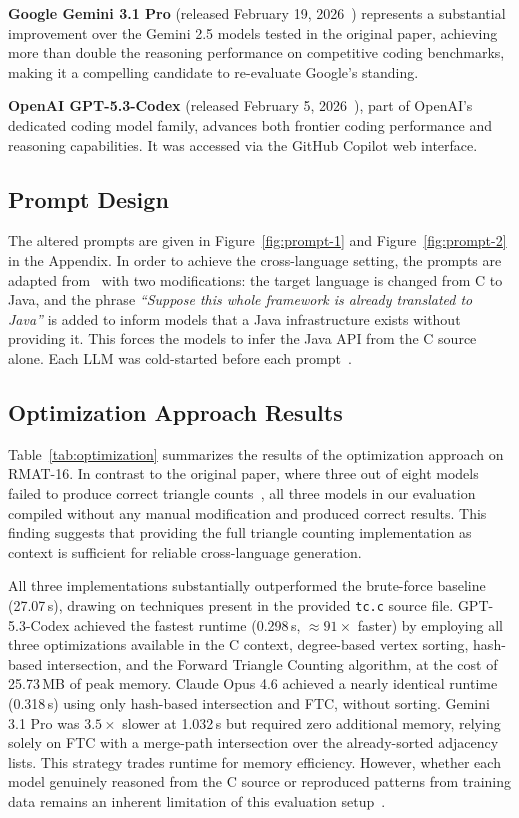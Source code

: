 \textbf{Google Gemini 3.1 Pro} (released February 19, 2026~\cite{google2026gemini31pro}) represents a substantial improvement over the Gemini 2.5 models tested in the original paper, achieving more than double the reasoning performance on competitive coding benchmarks, making it a compelling candidate to re-evaluate Google's standing.

\textbf{OpenAI GPT-5.3-Codex} (released February 5, 2026~\cite{openai2026gpt53codex}), part of OpenAI's dedicated coding model family, advances both frontier coding performance and reasoning capabilities. It was accessed via the GitHub Copilot web interface.

\subsection{Prompt Design}

The altered prompts are given in Figure~\ref{fig:prompt-1} and Figure~\ref{fig:prompt-2} in the Appendix. In order to achieve the cross-language setting, the prompts are adapted from~\cite{llmgen2025} with two modifications: the target language is changed from C to Java, and the phrase \textit{``Suppose this whole framework is already translated to Java''} is added to inform models that a Java infrastructure exists without providing it. This forces the models to infer the Java API from the C source alone. Each LLM was cold-started before each prompt~\cite{llmgen2025}.

\subsection{Optimization Approach Results}

Table~\ref{tab:optimization} summarizes the results of the optimization approach on RMAT-16.  In contrast to the original paper, where three out of eight models failed to produce correct triangle counts~\cite{llmgen2025}, all three models in our evaluation compiled without any manual modification and produced correct results. This finding suggests that providing the full triangle counting implementation as context is sufficient for reliable cross-language generation.

All three implementations substantially outperformed the brute-force baseline (27.07\,s), drawing on techniques present in the provided \texttt{tc.c} source file. GPT-5.3-Codex achieved the fastest runtime (0.298\,s, $\approx91\times$ faster) by employing all three optimizations available in the C context, degree-based vertex sorting, hash-based intersection, and the Forward Triangle Counting algorithm, at the cost of 25.73\,MB of peak memory. Claude Opus 4.6 achieved a nearly identical runtime (0.318\,s) using only hash-based intersection and FTC, without sorting. Gemini 3.1 Pro was $3.5\times$ slower at 1.032\,s but required zero additional memory, relying solely on FTC with a merge-path intersection over the already-sorted adjacency lists. This strategy trades runtime for memory efficiency. However, whether each model genuinely reasoned from the C source or reproduced patterns from training data remains an inherent limitation of this evaluation setup~\cite{llmgen2025}.

